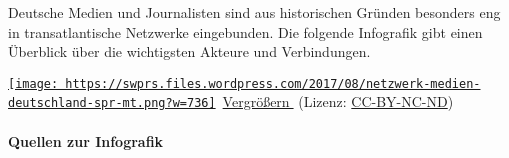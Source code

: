 Deutsche Medien und Journalisten sind aus historischen Gründen besonders
eng in transatlantische Netzwerke eingebunden. Die folgende Infografik
gibt einen Überblick über die wichtigsten Akteure und Verbindungen.

\href{https://swprs.files.wordpress.com/2017/08/netzwerk-medien-deutschland-spr-mt.png}{\texttt{[image: https://swprs.files.wordpress.com/2017/08/netzwerk-medien-deutschland-spr-mt.png?w=736]}}~\href{https://swprs.files.wordpress.com/2017/08/netzwerk-medien-deutschland-spr-mt.png}{Vergrößern🔎}
(Lizenz:
\href{https://creativecommons.org/licenses/by-nc-nd/4.0/deed.de}{CC-BY-NC-ND})

\hypertarget{quellen-zur-infografik}{%
\paragraph{Quellen zur Infografik}\label{quellen-zur-infografik}}

